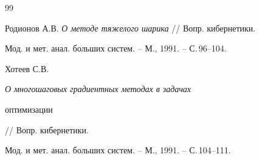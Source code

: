 \begin{thebibliography}{99}


Родионов А.В. {\em О методе тяжелого шарика} // Вопр. кибернетики. 


Мод. и мет. анал. больших систем. -- М., 1991. -- С.\,96--104.




Хотеев С.В. {\em О многошаговых градиентных методах в задачах 


оптимизации} // Вопр. кибернетики.


Мод. и мет. анал. больших систем. -- М., 1991. -- С.\,104--111.





\end{thebibliography}





\vskip 0.5cm












\label{end}








